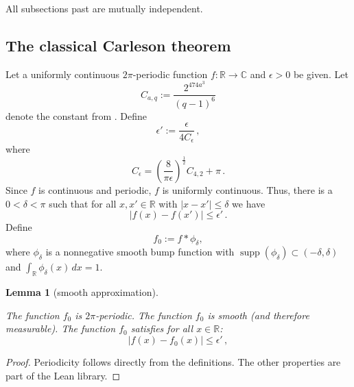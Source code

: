 \documentclass[10pt,a4paper]{article}
\theoremstyle{plain}
\newtheorem{lemma}[theorem]{Lemma}
\theoremstyle{definition}
\numberwithin{equation}{subsection}
\newcommand{\R}{{\mathbb{R}}}
\DeclareMathOperator{\supp}{\operatorname{supp}}
\newcommand{\lean}[1]{}
\newcommand{\leanok}{}
\begin{document}
All subsections past  are mutually independent.



\subsection{The classical Carleson theorem}
\label{10classical}

Let a uniformly continuous $2\pi$-periodic function $f:\R\to \mathbb{C}$ and $\epsilon>0$ be given.
Let
\begin{equation}
    C_{a,q} := \frac{2^{474a^3}}{(q-1)^6}
\end{equation}
denote the constant from .
Define
\begin{equation}
    \epsilon' := \frac {\epsilon} {4 C_\epsilon} \,,
\end{equation}
where
\begin{equation*}
    C_\epsilon = \left(\frac{8}{\pi\epsilon}\right)^\frac{1}{2} C_{4,2} + \pi \,.
\end{equation*}
Since $f$ is continuous and periodic, $f$ is uniformly continuous.
Thus, there is a $0<\delta<\pi$
such that for all $x,x' \in \R$ with $|x-x'|\le \delta$
we have
\begin{equation}\label{uniconbound}
|f(x)-f(x')|\le \epsilon' \, .
\end{equation}
Define
\begin{equation}\label{def-fzero}
f_0:=f \ast \phi_\delta,
\end{equation}
where $\phi_\delta$ is a nonnegative smooth bump function with $\supp (\phi_\delta) \subset (-\delta, \delta)$ and $\int _\R \phi_\delta (x) \, dx = 1$.

\begin{lemma}[smooth approximation]
\label{smooth-approximation}
\leanok
\lean{close_smooth_approx_periodic}
    The function $f_0$ is $2\pi$-periodic.
    The function $f_0$ is smooth (and therefore measurable).
    The function $f_0$ satisfies for all $x\in \R$:
    \begin{equation}\label{eq-ffzero}
    |f(x)-f_0(x)|\le \epsilon' \, ,
    \end{equation}
\end{lemma}

\begin{proof}
    \leanok
    Periodicity follows directly from the definitions. The other properties are part of the Lean library.
\end{proof}
\end{document}
